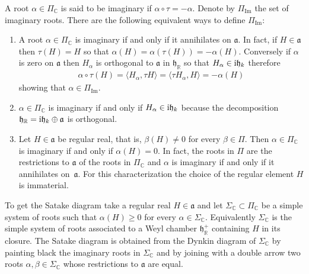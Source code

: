 \documentclass[pdftex]{sigma}
\numberwithin{equation}{section}
\newcommand{\func}[1]{\operatorname{#1}}
\begin{document}
A root $\alpha \in \Pi _{\mathbb{C}}$ is said to be imaginary if $\alpha\circ \tau =-\alpha $. Denote by $\Pi _{\func{Im}}$ the set of imaginary roots. There are the following equivalent ways to define $\Pi _{\func{Im}}$:

\begin{enumerate}\itemsep=0pt
\item A root $\alpha \in \Pi _{\mathbb{C}}$ is imaginary if and only if it annihilates on $\mathfrak{a}$. In fact, if $H\in \mathfrak{a}$ then $\tau(H) =H$ so that $\alpha (H) =\alpha ( \tau (H)) =-\alpha (H) $. Conversely if $\alpha $ is zero on $\mathfrak{a}$ then $H_{\alpha }$ is orthogonal to $\mathfrak{a}$ in $\mathfrak{h}_{\mathbb{R}}$ so that $H_{\alpha }\in {\rm i}\mathfrak{h}_{k}$ therefore
\begin{gather*}
\alpha \circ \tau (H) =\langle H_{\alpha },\tau H\rangle=\langle \tau H_{\alpha },H\rangle =-\alpha (H)
\end{gather*}
showing that $\alpha \in \Pi _{\func{Im}}$.

\item $\alpha \in \Pi _{\mathbb{C}}$ is imaginary if and only if $H_{\alpha}\in {\rm i}\mathfrak{h}_{k}$ because the decomposition $\mathfrak{h}_{\mathbb{R}}={\rm i}\mathfrak{h}_{k}\oplus \mathfrak{a}$ is orthogonal.

\item Let $H\in \mathfrak{a}$ be regular real, that is, $\beta (H ) \neq 0$ for every $\beta \in \Pi $. Then $\alpha \in \Pi _{\mathbb{C}}$ is imaginary if and only if $\alpha (H) =0$. In fact, the roots in $\Pi $ are the restrictions to $\mathfrak{a}$ of the roots in $\Pi_{\mathbb{C}}$ and $\alpha $ is imaginary if and only if it annihilates on~$\mathfrak{a}$. For this characterization the choice of the regular element $H $ is immaterial.
\end{enumerate}

To get the Satake diagram take a regular real $H\in \mathfrak{a}$ and let $\Sigma _{\mathbb{C}}\subset \Pi _{\mathbb{C}}$ be a simple system of roots such that $\alpha (H) \geq 0$ for every $\alpha \in \Sigma _{\mathbb{C}}$. Equivalently $\Sigma _{\mathbb{C}}$ is the simple system of roots associated to a Weyl chamber $\mathfrak{h}_{\mathbb{R}}^{+}$ containing $H$ in its closure. The Satake diagram is obtained from the Dynkin diagram of $\Sigma _{\mathbb{C}}$ by painting black the imaginary roots in $\Sigma _{\mathbb{C}}$ and by joining with a double arrow two roots $\alpha,\beta \in \Sigma _{\mathbb{C}}$ whose restrictions to $\mathfrak{a}$ are equal.
\end{document}
